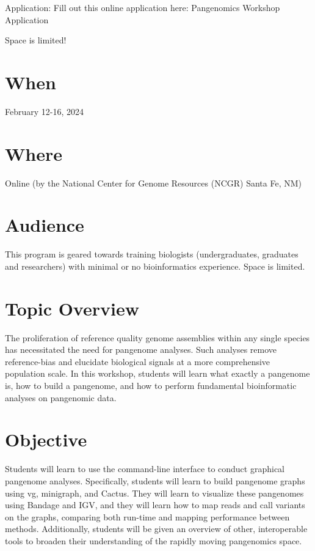 \documentclass[
]{book}
\begin{document}
Application: Fill out this online application here: Pangenomics Workshop Application

Space is limited!

\hypertarget{when-1}{%
\section*{When}\label{when-1}}

February 12-16, 2024

\hypertarget{where}{%
\section*{Where}\label{where}}

Online (by the National Center for Genome Resources (NCGR) Santa Fe, NM)

\hypertarget{audience}{%
\section*{Audience}\label{audience}}

This program is geared towards training biologists (undergraduates, graduates and researchers) with minimal or no bioinformatics experience. Space is limited.

\hypertarget{topic-overview}{%
\section*{Topic Overview}\label{topic-overview}}

The proliferation of reference quality genome assemblies within any single species has necessitated the need for pangenome analyses. Such analyses remove reference-bias and elucidate biological signals at a more comprehensive population scale. In this workshop, students will learn what exactly a pangenome is, how to build a pangenome, and how to perform fundamental bioinformatic analyses on pangenomic data.

\hypertarget{objective}{%
\section*{Objective}\label{objective}}

Students will learn to use the command-line interface to conduct graphical pangenome analyses. Specifically, students will learn to build pangenome graphs using vg, minigraph, and Cactus. They will learn to visualize these pangenomes using Bandage and IGV, and they will learn how to map reads and call variants on the graphs, comparing both run-time and mapping performance between methods. Additionally, students will be given an overview of other, interoperable tools to broaden their understanding of the rapidly moving pangenomics space.
\end{document}
